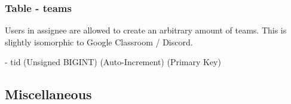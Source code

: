 \documentclass[12pt]{report}
\newcommand{\n}{\par}
\newcommand{\br}{\n\vspace{1 em}\n}
\begin{document}
\subsubsection{Table - teams} \label{data-layer.design.team-system.teams}
Users in assignee are allowed to create an arbitrary amount of teams.
This is slightly isomorphic to Google Classroom / Discord.
\br
- tid (Unsigned BIGINT) (Auto-Increment) (Primary Key)


\subsection{Miscellaneous}












\end{document}
